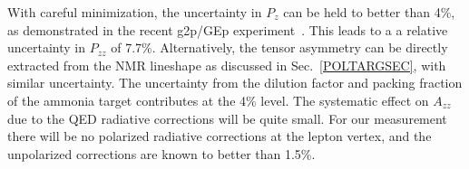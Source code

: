 %
%
%
With careful minimization, the uncertainty in $P_z$ can be held to better than
4\%, as demonstrated in the recent g2p/GEp experiment~\cite{DUSTIN}. 
This leads to a a relative uncertainty in $P_{zz}$ of 7.7\%.  Alternatively, the tensor asymmetry can be directly extracted from the NMR lineshape as discussed in Sec.~\ref{POLTARGSEC}, with similar uncertainty.  The uncertainty from the dilution factor and packing fraction of the ammonia target contributes at the 4\% level.
%
The systematic effect on $A_{zz}$ due to the QED radiative corrections will be quite small.  For our measurement
there will be no polarized radiative corrections at the lepton vertex, and the unpolarized corrections are known
to better than 1.5\%.

